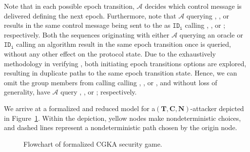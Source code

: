 Note that in each possible epoch transition, \(\mathcal{A}\) decides which control message is delivered defining the next epoch.
Furthermore, note that \(\mathcal{A}\) querying , , or  results in the same control message being sent to the  as \(\mathtt{ID_i}\) calling , , or ; respectively.
Both the sequences originating with either \(\mathcal{A}\) querying an oracle or \(\mathtt{ID_i}\) calling an algorithm result in the same epoch transition once  is queried, without any other effect on the protocol state.
Due to the exhaustively methodology in verifying , both initiating epoch transitions options are explored, resulting in duplicate paths to the same epoch transition state.
Hence, we can omit the group members from calling calling , , or , and without loss of generality, have \(\mathcal{A}\) query , , or ; respectively.

We arrive at a formalized and reduced  model for a$( \textbf{T}, \textbf{C}, \textbf{N} )$-attacker depicted in Figure\ \ref{fig:CGKA-old-flowchart}.
Within the depiction, yellow nodes make nondeterministic choices, and dashed lines represent a nondeterministic path chosen by the origin node.
\begin{figure}
  \centering
  \caption{\label{fig:CGKA-old-flowchart}Flowchart of formalized CGKA security game.}
\end{figure}



